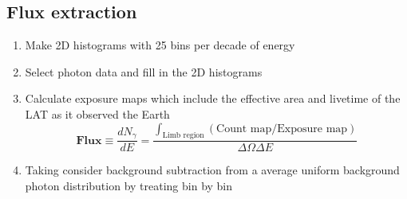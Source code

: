 \subsection{Flux extraction}
\begin{enumerate}
    \item Make 2D histograms with 25 bins per decade of energy
    \item Select photon data and fill in the 2D histograms
    \item Calculate exposure maps which include the effective area and livetime of the LAT as it observed the Earth
    \begin{equation}
      \textbf{Flux} \equiv \frac{dN_\gamma}{dE} = \frac{\int_{\text{Limb region}}(\text{Count map}/\text{Exposure map})}{\Delta\Omega\Delta E }
    \end{equation}
    \item Taking consider background subtraction from a average uniform background photon distribution by treating bin by bin 
\end{enumerate}



